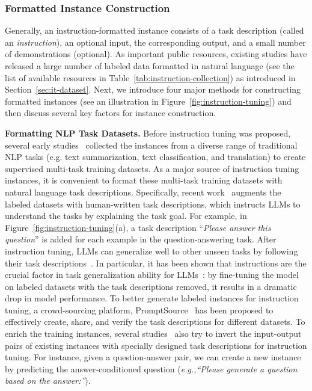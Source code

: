 \subsubsection{Formatted Instance Construction}\label{sec-instruction-formatted} 
Generally, an instruction-formatted instance consists of a task description (called an \emph{instruction}), an optional input, the corresponding output, and a small number of demonstrations (optional). As important public resources, existing studies have released a large number of labeled data formatted in natural language (see the list of available resources in Table~\ref{tab:instruction-collection}) as introduced in Section~\ref{sec:it-dataset}. 
Next, we introduce four major methods for constructing formatted instances (see an illustration in Figure~\ref{fig:instruction-tuning}) and then discuss several key factors for instance construction.  

\textbf{Formatting NLP Task Datasets.} Before instruction tuning was proposed, several early  studies~\cite{Liu-ACL-2019-Multi,Aghajanyan-EMNLP-2021-Muppet,Tang-arxiv-2022-MVP} collected the instances from a diverse range of traditional NLP tasks (e.g. text summarization, text classification, and translation) to create supervised multi-task training datasets. As a major source of instruction tuning instances, it is convenient to format these multi-task training  datasets with natural language task descriptions. Specifically, recent work~\cite{Wei-ICLR-2022-Finetuned,Sanh-ICLR-2022-Multitask,Ouyang-arxiv-2022-Training,Wang-EMNLP-2022-Super}  augments the labeled datasets with human-written task descriptions, which instructs LLMs to understand the tasks by explaining the task goal. For example, in Figure~\ref{fig:instruction-tuning}(a),  a task description ``\emph{Please answer this question}'' is added for each example in the question-answering task. After instruction tuning, LLMs can generalize well to other unseen tasks by following their task descriptions~\cite{Wei-ICLR-2022-Finetuned,Sanh-ICLR-2022-Multitask,Chung-arxiv-2022-Scaling}. In particular, it has been shown that instructions are the crucial factor in task generalization ability for LLMs~\cite{Wei-ICLR-2022-Finetuned}: by fine-tuning the model on labeled datasets with the task descriptions removed, it results in a dramatic drop in model performance. To better generate labeled instances for instruction tuning, a crowd-sourcing platform, PromptSource~\cite{Bach-ACL-2022-PromptSource} has been proposed to effectively create, share, and verify the task descriptions for different datasets. To enrich the training instances, several studies~\cite{Sanh-ICLR-2022-Multitask,Tang-arxiv-2022-MVP,Longpre-arxiv-2023-The} also try to invert the input-output pairs of existing instances with specially designed task descriptions for instruction tuning. For instance, given a question-answer pair, we can create a new instance by predicting the answer-conditioned question (\emph{e.g.,}\emph{``Please generate a question based on the answer:''}). 

